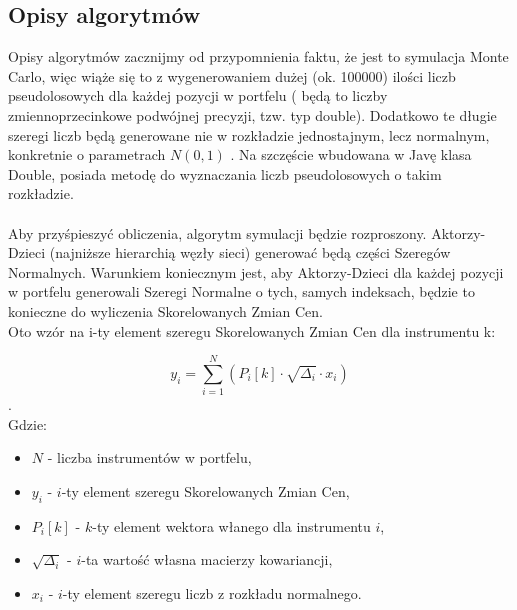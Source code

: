 \documentclass[11pt,titlepage]{article}
\begin{document}
\subsection{Opisy algorytmów}

Opisy algorytmów zacznijmy od przypomnienia faktu, że jest to symulacja Monte Carlo, więc wiąże się to z wygenerowaniem dużej (ok. 100000) ilości liczb pseudolosowych dla każdej pozycji w portfelu ( będą to liczby zmiennoprzecinkowe podwójnej precyzji, tzw. typ double). Dodatkowo te długie szeregi liczb będą generowane nie w rozkładzie jednostajnym, lecz normalnym, konkretnie o parametrach $ N (0,1) $ . Na szczęście wbudowana w Javę klasa Double, posiada metodę do wyznaczania liczb pseudolosowych o takim rozkładzie.
\\
\\
Aby przyśpieszyć obliczenia, algorytm symulacji będzie rozproszony. Aktorzy-Dzieci (najniższe hierarchią węzły sieci) generować będą części Szeregów Normalnych. Warunkiem koniecznym jest, aby Aktorzy-Dzieci dla każdej pozycji w portfelu generowali Szeregi Normalne o tych, samych indeksach, będzie to konieczne do wyliczenia Skorelowanych Zmian Cen.
\\
Oto wzór na i-ty element szeregu Skorelowanych Zmian Cen dla instrumentu k:

$$y_i=\sum_{i=1}^{N}(P_i[k]\cdot\sqrt{\Delta_i}\cdot x_i)$$.\\

Gdzie:
\begin{itemize}
  \item $N$ - liczba instrumentów w portfelu,
	\item $y_i$ - $i$-ty element szeregu Skorelowanych Zmian Cen,
	\item $P_i[k]$ - $k$-ty element wektora włanego dla instrumentu $i$,
	\item $\sqrt{\Delta_i}$ - $i$-ta wartość własna macierzy kowariancji,
	\item $x_i$ - $i$-ty element szeregu liczb z rozkładu normalnego.

\end{itemize}
\end{document}
